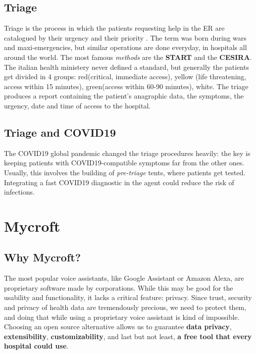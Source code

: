 \documentclass[conference]{IEEEtran}
\begin{document}
\subsection{Triage}
Triage is the process in which the patients requesting help in the ER are catalogued by their urgency and their priority \cite{bazyar2020principle}. The term was born during wars and maxi-emergencies, but similar operations are done everyday, in hospitals all around the world. The most famous \textit{methods} are the \textbf{START} and the \textbf{CESIRA}. The italian health ministery never defined a standard, but generally the patients get divided in 4 groups: red(critical, immediate access), yellow (life threatening, access within 15 minutes), green(access within 60-90 minutes), white. The triage produces a report containing the patient's anagraphic data, the symptoms, the urgency, date and time of access to the hospital.
\subsection{Triage and COVID19}
\label{COVID}
The COVID19 global pandemic changed the triage procedures heavily: the key is keeping patients with COVID19-compatible symptoms far from the other ones\cite{10.1093/jamia/ocaa01}. Usually, this involves the building of \textit{pre-triage} tents, where patients get tested. Integrating a fast COVID19 diagnostic in the agent could reduce the risk of infections.
\section{Mycroft}
\label{sec:mycroft}
\subsection{Why Mycroft?}
The most popular voice assistants, like Google Assistant or Amazon Alexa, are proprietary software made by corporations. While this may be good for the usability and functionality, it lacks a critical feature: privacy. Since trust, security and privacy of health data are tremendously precious, we need to protect them, and doing that while using a proprietary voice assistant is kind of impossible. Choosing an open source alternative allows us to guarantee \textbf{data privacy}, \textbf{extensibility}, \textbf{customizability}, and last but not least, \textbf{a free tool that every hospital could use}.
\end{document}

